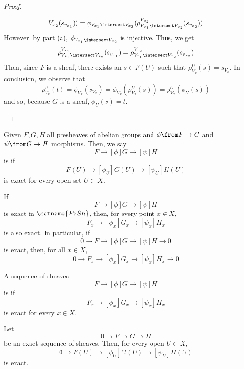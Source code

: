 \documentclass[11pt,leqno,oneside]{amsbook}
\renewcommand{\F}{F} %
\newcommand{\G}{G}
\renewcommand{\H}{H}
\numberwithin{thm}{section}
\begin{document}
\begin{proof}
\begin{enumerate}
\[{        V_{x_2}}(s_{v_{x_1}})) = \phi_{V_{x_1}
        \intersect V_{x_2}}(\rho^{V_{x_2}}_{V_{x_1} \intersect
        V_{x_2}}(s_{v_{x_2}})) 
    \]
    However, by part (a), \(\phi_{V_{x_1} \intersect V_{x_2}}\) is
    injective. Thus, we get \[
      \rho^{V_{x_1}}_{V_{x_1} \intersect
        V_{x_2}}(s_{v_{x_1}}) = \rho^{V_{x_2}}_{V_{x_1} \intersect
        V_{x_2}}(s_{v_{x_2}})
    \]
    Then, since \(\F\) is a sheaf, there exists an \(s \in \F(U)\)
    such that \(\rho^U_{V_x}(s) = s_{V_x}\). In conclusion, we observe
    that \[
      \rho^U_{V_x}(t) = \phi_{V_x}(s_{V_x}) =
      \phi_{V_x}(\rho^U_{V_x}(s)) = \rho^U_{V_x}(\phi_U(s))
    \]
    and so, because \(G\) is a sheaf, \(\phi_U(s) = t\).
  \end{enumerate}
\end{proof}
\begin{defn}
  Given \(\F,\G,\H\) all presheaves of abelian groups and \(\phi \from
  \F \to \G\) and \(\psi \from \G \to \H\) morphisms. Then, we say \[
    \F \to[\phi] \G \to[\psi] \H
  \]
  is  if \[
    \F(U) \to[\phi_U] \G(U) \to[\psi_U] \H(U)
  \]
  is exact for every open set \(U \subset X\).
\end{defn}
\begin{cor}
  If \[
    \F \to[\phi] \G \to[\psi] \H
  \] is exact in \(\catname{PrSh}\),
  then, for every point \(x \in X\), \[
    \F_x \to[\phi_x] \G_x \to[\psi_x] \H_x
  \]
  is also exact. In particular, if \[
    0 \to \F \to[\phi] \G \to[\psi] \H \to 0
  \]
  is exact, then, for all \(x \in X\), \[
    0 \to \F_x \to[\phi_x] \G_x \to[\psi_x] \H_x \to 0
  \]
\end{cor}
\begin{defn}
  A sequence of sheaves \[
    \F \to[\phi] \G \to[\psi] \H
  \] is  if \[
    \F_x \to[\phi_x] \G_x \to[\psi_x] \H_x
  \]
  is exact for every \(x \in X\).
\end{defn}
\begin{thm}
  Let \[
    0 \to \F \to \G \to \H
  \]
  be an exact sequence of sheaves. Then, for every open \(U \subset
  X\), \[
    0 \to \F(U) \to[\phi_U] \G(U) \to[\psi_U] \H(U)
  \]
  is exact.
\end{thm}
\end{document}
